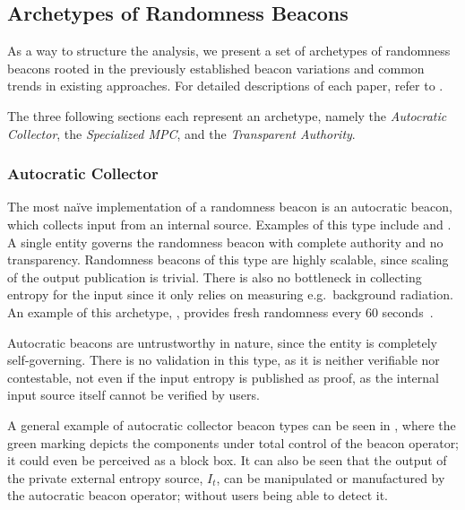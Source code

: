 \subsection{Archetypes of Randomness Beacons}
As a way to structure the analysis, we present a set of archetypes of randomness beacons rooted in the previously established beacon variations and common trends in existing approaches.
For detailed descriptions of each paper, refer to .

The three following sections each represent an archetype, namely the \emph{Autocratic Collector}, the \emph{Specialized MPC}, and the \emph{Transparent Authority}.

\subsubsection{Autocratic Collector}\label{ssub:autocratic}
The most naïve implementation of a randomness beacon is an autocratic beacon, which collects input from an internal source.
Examples of this type include  and .
A single entity governs the randomness beacon with complete authority and no transparency.
Randomness beacons of this type are highly scalable, since scaling of the output publication is trivial.
There is also no bottleneck in collecting entropy for the input since it only relies on measuring e.g.\ background radiation.
An example of this archetype, , provides fresh randomness every 60 seconds~\cite{nistbeacon}.

Autocratic beacons are untrustworthy in nature, since the entity is completely self-governing.
There is no validation in this type, as it is neither verifiable nor contestable, not even if the input entropy is published as proof, as the internal input source itself cannot be verified by users.

A general example of autocratic collector beacon types can be seen in , where the green marking depicts the components under total control of the beacon operator; it could even be perceived as a block box.
It can also be seen that the output of the private external entropy source, $I_t$, can be manipulated or manufactured by the autocratic beacon operator; without users being able to detect it.

